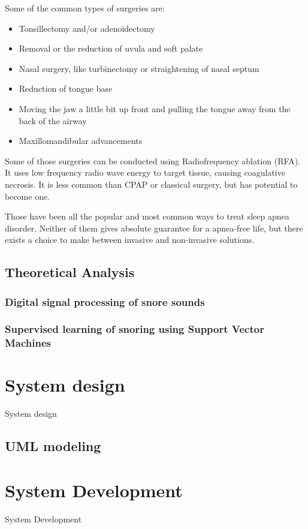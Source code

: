 \documentclass[12pt,a4paper]{report}
\begin{document}
Some of the common types of surgeries are:
\begin{itemize}
 \item Tonsillectomy and/or adenoidectomy 
 \item Removal or the reduction of uvula and soft palate
 \item Nasal surgery, like turbinectomy or straightening of nasal septum
 \item Reduction of tongue base
 \item Moving the jaw a little bit up front and pulling the tongue away from the back of the airway
 \item Maxillomandibular advancements
\end{itemize}

Some of those surgeries can be conducted using Radiofrequency ablation (RFA). It uses low frequency radio wave energy to target tissue, causing coagulative necrosis. It is less common than CPAP or classical surgery, but has potential to become one.


Those have been all the popular and most common ways to treat sleep apnea disorder. Neither of them gives absolute guarantee for a apnea-free life, but there exists a choice to make between invasive and non-invasive solutions. 

\section{Theoretical Analysis}
\subsection{Digital signal processing of snore sounds}
\subsection{Supervised learning of snoring using Support Vector Machines}


\chapter{System design}
System design
\section{UML modeling}

\chapter{System Development}
System Development
\end{document}
